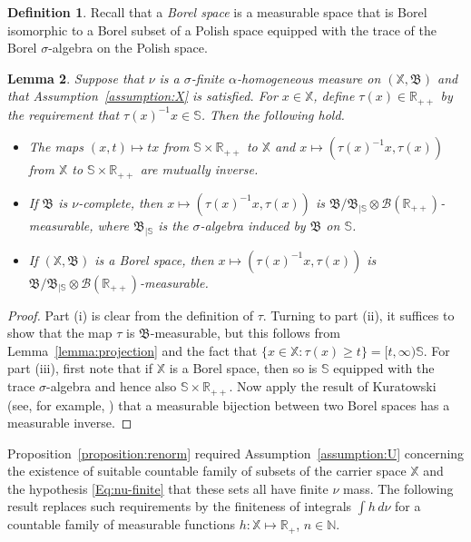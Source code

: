 \documentclass[12pt]{amsart}
\numberwithin{equation}{section}
\numberwithin{figure}{section}
\theoremstyle{plain} \newtheorem{theorem}{Theorem}[section]
\theoremstyle{plain} \newtheorem{proposition}[theorem]{Proposition}
\theoremstyle{plain} \newtheorem{lemma}[theorem]{Lemma}
\theoremstyle{plain} \newtheorem{corollary}[theorem]{Corollary}
\theoremstyle{definition} \newtheorem{definition}[theorem]{Definition}
\theoremstyle{definition} \newtheorem{notation}[theorem]{Notation}
\theoremstyle{remark} \newtheorem{remark}[theorem]{Remark}
\theoremstyle{remark} \newtheorem{example}[theorem]{Example}
\theoremstyle{definition} \newtheorem{assumption}{Assumption}
\newcommand{\bN}{\mathbb{N}}
\newcommand{\bR}{\mathbb{R}}
\newcommand{\bS}{\mathbb{S}}
\newcommand{\bX}{\mathbb{X}}
\newcommand{\cB}{\mathcal{B}}
\newcommand{\salg}{\mathfrak{B}}
\begin{document}
\begin{definition}
  Recall that a {\em Borel space} is a measurable space that is Borel
  isomorphic to a Borel subset of a Polish space equipped with the
  trace of the Borel $\sigma$-algebra on the Polish space.
\end{definition}

\begin{lemma}
  \label{lemma:pair-of-maps}
  Suppose that $\nu$ is a $\sigma$-finite $\alpha$-homogeneous measure
  on $(\bX,\salg)$ and that Assumption~\ref{assumption:X} is
  satisfied.  For $x \in \bX$, define $\tau(x) \in \bR_{++}$ by the
  requirement that $\tau(x)^{-1}x\in\bS$.  Then the following hold.
  \begin{itemize}
  \item[i)] The maps $(x,t)\mapsto tx$ from $\bS\times\bR_{++}$ to
    $\bX$ and $x\mapsto(\tau(x)^{-1}x,\tau(x))$ from $\bX$ to
    $\bS\times\bR_{++}$ are mutually inverse.
  \item[ii)] If $\salg$ is $\nu$-complete, then
    $x\mapsto(\tau(x)^{-1}x,\tau(x))$ is $\salg / \salg_{| \bS}
    \otimes \cB(\bR_{++})$-measurable, where $\salg_{| \bS}$ is the
    $\sigma$-algebra induced by $\salg$ on $\bS$.
  \item[iii)] If $(\bX,\salg)$ is a Borel space, then
    $x\mapsto(\tau(x)^{-1}x,\tau(x))$ is $\salg / \salg_{| \bS}
    \otimes \cB(\bR_{++})$-measurable.
  \end{itemize}
\end{lemma}

\begin{proof}
  Part (i) is clear from the definition of $\tau$.  Turning to part
  (ii), it suffices to show that the map $\tau$ is $\salg$-measurable,
  but this follows from Lemma~\ref{lemma:projection} and the fact that
  $\{x \in \bX : \tau(x) \ge t\} = [t,\infty) \bS$.  For part (iii),
  first note that if $\bX$ is a Borel space, then so is $\bS$ equipped
  with the trace $\sigma$-algebra and hence also $\bS \times
  \bR_{++}$.  Now apply the result of Kuratowski (see,
	for example, \cite[Section I.3]{par67}) that a measurable bijection between
  two Borel spaces has a measurable inverse.
\end{proof}

Proposition~\ref{proposition:renorm} required
Assumption~\ref{assumption:U} concerning the existence of suitable
countable family of subsets of the carrier space $\bX$ and the
hypothesis \eqref{Eq:nu-finite} that these sets all have finite $\nu$
mass.  The following result replaces such requirements by the
finiteness of integrals $\int h \, d\nu$ for a countable family of
measurable functions $h:\bX\mapsto\bR_+$, $n\in\bN$.
\end{document}
